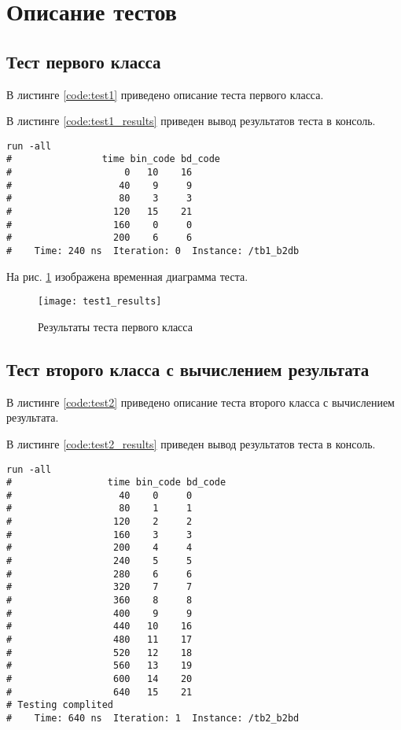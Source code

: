 \section{Описание тестов}
\label{sec:tests}

\subsection{Тест первого класса}

В листинге \ref{code:test1} приведено описание теста первого класса.


В листинге \ref{code:test1_results} приведен вывод результатов теста в консоль.
\begin{lstlisting}[caption=Результаты теста первого класса, label=code:test1_results, style=console]
run -all
# 		         time bin_code bd_code
#                    0   10    16
#                   40    9     9
#                   80    3     3
#                  120   15    21
#                  160    0     0
#                  200    6     6
#    Time: 240 ns  Iteration: 0  Instance: /tb1_b2db
\end{lstlisting}

На рис. \ref{fig:test1_results} изображена временная диаграмма теста.
\begin{figure}[H]
	\begin{center}
		\texttt{[image: test1\_results]}
		\caption{Результаты теста первого класса}
		\label{fig:test1_results}
	\end{center}
\end{figure}

\subsection{Тест второго класса с вычислением результата}

В листинге \ref{code:test2} приведено описание теста второго класса с вычислением результата.


В листинге \ref{code:test2_results} приведен вывод результатов теста в консоль.
\begin{lstlisting}[caption=Результаты теста второго класса с вычислением результата, label=code:test2_results, style=console]
run -all
# 		          time bin_code bd_code
#                   40    0     0
#                   80    1     1
#                  120    2     2
#                  160    3     3
#                  200    4     4
#                  240    5     5
#                  280    6     6
#                  320    7     7
#                  360    8     8
#                  400    9     9
#                  440   10    16
#                  480   11    17
#                  520   12    18
#                  560   13    19
#                  600   14    20
#                  640   15    21
# Testing complited
#    Time: 640 ns  Iteration: 1  Instance: /tb2_b2bd
\end{lstlisting}

